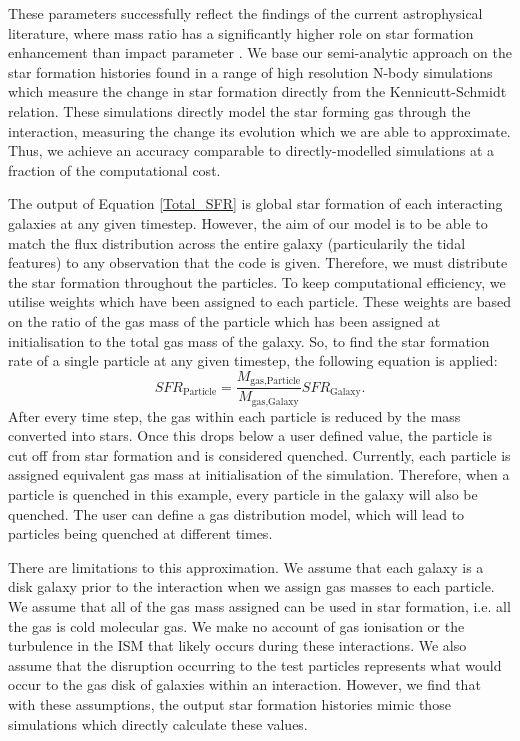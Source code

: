 These parameters successfully reflect the findings of the current astrophysical literature, where mass ratio has a significantly higher role on star formation enhancement than impact parameter \citep{2003ApJ...582..668B, 2008MNRAS.391.1137L, 2008MNRAS.385.1903L}. We base our semi-analytic approach on the star formation histories found in a range of high resolution N-body simulations \citep{1996ApJ...464..641M, 2000MNRAS.312..859S, 2019MNRAS.490.2139R} which measure the change in star formation directly from the Kennicutt-Schmidt \citep{1998ApJ...498..541K} relation. These simulations directly model the star forming gas through the interaction, measuring the change its evolution which we are able to approximate. Thus, we achieve an accuracy comparable to directly-modelled simulations at a fraction of the computational cost.

The output of Equation \ref{Total_SFR} is global star formation of each interacting galaxies at any given timestep. However, the aim of our model is to be able to match the flux distribution across the entire galaxy (particularily the tidal features) to any observation that the code is given. Therefore, we must distribute the star formation throughout the particles. To keep computational efficiency, we utilise weights which have been assigned to each particle. These weights are based on the ratio of the gas mass of the particle which has been assigned at initialisation to the total gas mass of the galaxy. So, to find the star formation rate of a single particle at any given timestep, the following equation is applied:
\begin{equation}
SFR_{\text{Particle}} = \frac{M_{\text{gas,Particle}}}{M_{\text{gas,Galaxy}}}SFR_{\text{Galaxy}}.
\end{equation}
After every time step, the gas within each particle is reduced by the mass converted into stars. Once this drops below a user defined value, the particle is cut off from star formation and is considered quenched. Currently, each particle is assigned equivalent gas mass at initialisation of the simulation. Therefore, when a particle is quenched in this example, every particle in the galaxy will also be quenched. The user can define a gas distribution model, which will lead to particles being quenched at different times.

There are limitations to this approximation. We assume that each galaxy is a disk galaxy prior to the interaction when we assign gas masses to each particle. We assume that all of the gas mass assigned can be used in star formation, i.e. all the gas is cold molecular gas. We make no account of gas ionisation or the turbulence in the ISM that likely occurs during these interactions. We also assume that the disruption occurring to the test particles represents what would occur to the gas disk of galaxies within an interaction. However, we find that with these assumptions, the output star formation histories mimic those simulations which directly calculate these values. 

